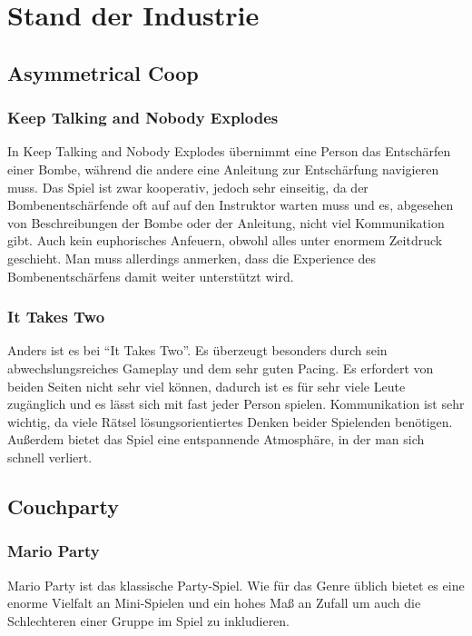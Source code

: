 \chapter{Stand der Industrie\label{_industrie}}

\section{Asymmetrical Coop}

\subsection{Keep Talking and Nobody Explodes}
In Keep Talking and Nobody Explodes übernimmt eine Person das Entschärfen einer Bombe, während die andere eine Anleitung zur Entschärfung navigieren muss. Das Spiel ist zwar kooperativ, jedoch sehr einseitig, da der Bombenentschärfende oft auf auf den Instruktor warten muss und es, abgesehen von Beschreibungen der Bombe oder der Anleitung, nicht viel Kommunikation gibt. Auch kein euphorisches Anfeuern, obwohl alles unter enormem Zeitdruck geschieht. Man muss allerdings anmerken, dass die Experience des Bombenentschärfens damit weiter unterstützt wird.

\subsection{It Takes Two}
Anders ist es bei "`It Takes Two"'. Es überzeugt besonders durch sein abwechslungsreiches Gameplay und dem sehr guten Pacing. Es erfordert von beiden Seiten nicht sehr viel können, dadurch ist es für sehr viele Leute zugänglich und es lässt sich mit fast jeder Person spielen. Kommunikation ist sehr wichtig, da viele Rätsel lösungsorientiertes Denken beider Spielenden benötigen. Außerdem bietet das Spiel eine entspannende Atmosphäre, in der man sich schnell verliert.

\section{Couchparty}

\subsection{Mario Party}
Mario Party ist das klassische Party-Spiel. Wie für das Genre üblich bietet es eine enorme Vielfalt an Mini-Spielen und ein hohes Maß an Zufall um auch die Schlechteren einer Gruppe im Spiel zu inkludieren.

